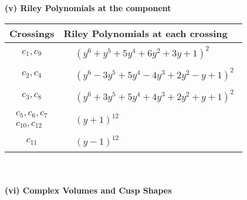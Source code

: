\documentclass[1p]{elsarticle_modified}
\theoremstyle{definition}
\begin{document}
\newpage\renewcommand{\arraystretch}{1}
\flushleft \textbf{(v) Riley Polynomials at the component}\newline \\
\begin{tabular}{m{50pt}|m{274pt}}
Crossings & \hspace{64pt}Riley Polynomials at each crossing \\
\hline $$\begin{aligned}c_{1},c_{9}\end{aligned}$$&$\begin{aligned}
&(y^6+y^5+5 y^4+6 y^2+3 y+1)^2
\end{aligned}$\\
\hline $$\begin{aligned}c_{2},c_{4}\end{aligned}$$&$\begin{aligned}
&(y^6-3 y^5+5 y^4-4 y^3+2 y^2- y+1)^2
\end{aligned}$\\
\hline $$\begin{aligned}c_{3},c_{8}\end{aligned}$$&$\begin{aligned}
&(y^6+3 y^5+5 y^4+4 y^3+2 y^2+y+1)^2
\end{aligned}$\\
\hline $$\begin{aligned}c_{5},c_{6},c_{7}\\c_{10},c_{12}\end{aligned}$$&$\begin{aligned}
&(y+1)^{12}
\end{aligned}$\\
\hline $$\begin{aligned}c_{11}\end{aligned}$$&$\begin{aligned}
&(y-1)^{12}
\end{aligned}$\\
\hline
\end{tabular}\\~\\
\newpage\flushleft \textbf{(vi) Complex Volumes and Cusp Shapes}
\end{document}
